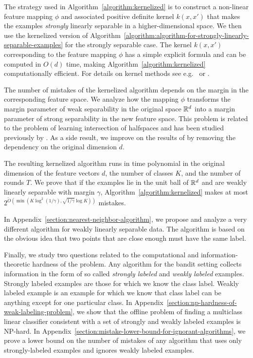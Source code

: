 The strategy used in Algorithm~\ref{algorithm:kernelized} is to construct a
non-linear feature mapping $\phi$ and associated positive definite kernel
$k(x,x')$ that makes the examples \emph{strongly} linearly separable in a
higher-dimensional space. We then use the kernelized version of
Algorithm~\ref{algorithm:algorithm-for-strongly-linearly-separable-examples} for
the strongly separable case. The kernel $k(x,x')$ corresponding to the feature
mapping $\phi$ has a simple explicit formula and can be computed in $O(d)$ time,
making Algorithm~\ref{algorithm:kernelized} computationally efficient. For
details on kernel methods see e.g.~\citet{Scholkopf-Smola-2002} or
\citet{Shawe-Taylor-Cristianini-2004}.

The number of mistakes of the kernelized algorithm depends on the margin in the
corresponding feature space. We analyze how the mapping $\phi$ transforms the
margin parameter of weak separability in the original space $\mathbb{R}^d$ into a margin
parameter of strong separability in the new feature space. This problem is
related to the problem of learning intersection of halfspaces and has been
studied previously by \citet{Klivans-Servedio-2008}. As a side result, we
improve on the results of \citet{Klivans-Servedio-2008} by removing the
dependency on the original dimension $d$.

The resulting kernelized algorithm runs in time polynomial in the
original dimension of the feature vectors $d$, the number of classes $K$, and
the number of rounds $T$. We prove that if the examples lie in the unit ball of
$\mathbb{R}^d$ and are weakly linearly separable with margin $\gamma$,
Algorithm~\ref{algorithm:kernelized} makes at
most $2^{\widetilde{O}(\min(K \log^2 (1/\gamma), \sqrt{1/\gamma}
\log K))}$ mistakes.

In Appendix~\ref{section:nearest-neighbor-algorithm}, we propose and analyze a
very different algorithm for weakly linearly separable data. The algorithm is
based on the obvious idea that two points that are close enough must have the
same label.

Finally, we study two questions related to the computational and
information-theoretic hardness of the problem. Any algorithm for the bandit
setting collects information in the form of so called \emph{strongly labeled}
and \emph{weakly labeled} examples. Strongly labeled examples are those for
which we know the class label. Weakly labeled example is an example for which we
know that class label can be anything except for one particular class. In
Appendix~\ref{section:np-hardness-of-weak-labeling-problem}, we show that the
offline problem of finding a multiclass linear classifier consistent with a set
of strongly and weakly labeled examples is NP-hard. In
Appendix~\ref{section:mistake-lower-bound-for-ignorant-algorithms}, we prove a
lower bound on the number of mistakes of any algorithm that uses only
strongly-labeled examples and ignores weakly labeled examples.
